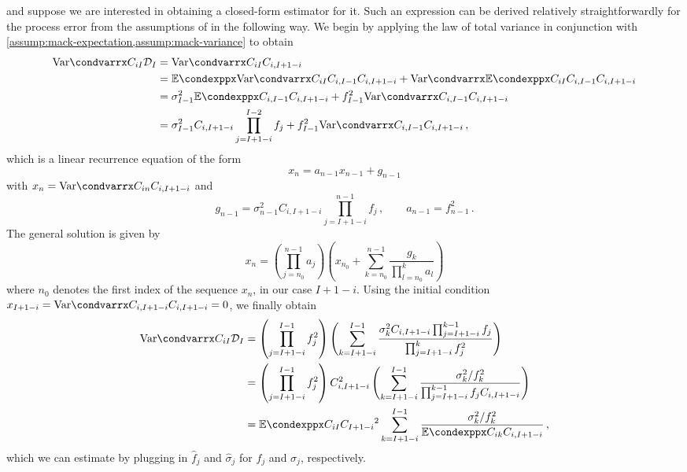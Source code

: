 \documentclass[a4paper]{book}
\begin{document}
and suppose we are interested in obtaining a closed-form estimator for it. Such an expression can be derived relatively straightforwardly for the process error from the assumptions of  in the following way. We begin by applying the law of total variance in conjunction with \cref{assump:mack-expectation,assump:mack-variance} to obtain
\begin{align}
  \condvarr{C_{iI}}{\mathcal{D}_I} & = \condvarr{C_{iI}}{C_{i, I + 1 - i}}                                                                                             \\
                                   & = \condexpp{\condvarr{C_{iI}}{C_{i, I - 1}}}{C_{i, I + 1 - i}} + \condvarr{\condexpp{C_{iI}}{C_{i, I - 1}}}{C_{i, I + 1 - i}}     \\
                                   & = \sigma^2_{I - 1} \condexpp{C_{i, I - 1}}{C_{i, I + 1 - i}} + f^2_{I - 1} \condvarr{C_{i, I - 1}}{C_{i, I + 1 - i}}              \\
                                   & = \sigma^2_{I - 1} C_{i, I + 1 - i} \prod_{j = I + 1 - i}^{I - 2} f_j + f^2_{I - 1} \condvarr{C_{i, I - 1}}{C_{i, I + 1 - i}} \,,
\end{align}
which is a linear recurrence equation of the form
\begin{equation}
  x_n = a_{n - 1} x_{n - 1} + g_{n - 1}
\end{equation}
with $x_n = \condvarr{C_{in}}{C_{i, I + 1 - i}}$ and
\begin{equation}
  g_{n - 1} = \sigma^2_{n - 1} C_{i, I + 1 - i} \prod_{j = I + 1 - i}^{n - 1} f_j \,, \qquad a_{n - 1} = f^2_{n - 1} \,.
\end{equation}
The general solution is given by
\begin{equation}
  x_n = \left( \prod_{j = n_0}^{n - 1} a_j \right) \left( x_{n_0} + \sum_{k = n_0}^{n - 1} \frac{g_k}{\prod_{l = n_0}^k a_l} \right)
\end{equation}
where $n_0$ denotes the first index of the sequence $x_n$, in our case $I + 1 - i$. Using the initial condition $x_{I + 1 - i} = \condvarr{C_{i, I + 1 - i}}{C_{i, I + 1 - i}} = 0$, we finally obtain
\begin{align}
  \condvarr{C_{iI}}{\mathcal{D}_I}
   & = \left( \prod_{j = I + 1 - i}^{I - 1} f^2_j \right) \left( \sum_{k = I + 1 - i}^{I - 1} \frac{\sigma^2_k C_{i, I + 1 - i} \prod_{j = I + 1 - i}^{k - 1} f_j}{\prod_{j = I + 1 - i}^k f^2_j} \right) \\
   & = \left( \prod_{j = I + 1 - i}^{I - 1} f^2_j \right) C^2_{i, I + 1 - i} \left( \sum_{k = I + 1 - i}^{I - 1} \frac{\sigma^2_k / f^2_k}{\prod_{j = I + 1 - i}^{k - 1} f_j C_{i, I + 1 - i}} \right)    \\
   & = \condexpp{C_{iI}}{C_{I + 1 - i}}^2 \sum_{k = I + 1 - i}^{I - 1} \frac{\sigma^2_k / f^2_k}{\condexpp{C_{ik}}{C_{i, I + 1 - i}}} \,,
\end{align}
which we can estimate by plugging in $\widehat{f}_j$ and $\widehat{\sigma}_j$ for $f_j$ and $\sigma_j$, respectively.
\end{document}

